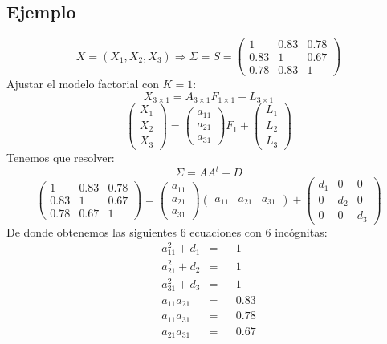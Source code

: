 \documentclass[11pt,a4paper]{article}
\begin{document}
\subsection{Ejemplo}

$$X = (X_{1}, X_{2}, X_{3}) \Rightarrow \Sigma = S = \begin{pmatrix}
1 & 0.83 & 0.78 \\
0.83 & 1 & 0.67 \\
0.78 & 0.83 & 1
\end{pmatrix}$$
Ajustar el modelo factorial con $K=1$:
$$X_{3 \times 1} = A_{3 \times 1}F_{1 \times 1} + L_{3 \times 1}$$
$$\begin{pmatrix} X_{1} \\ X_{2} \\ X_{3} \end{pmatrix} = \begin{pmatrix} a_{11} \\ a_{21} \\ a_{31} \end{pmatrix} F_{1} + \begin{pmatrix} L_{1} \\ L_{2} \\ L_{3} \end{pmatrix}$$
Tenemos que resolver:
$$\Sigma = AA^{t} + D$$
$$\begin{pmatrix}
1 & 0.83 & 0.78 \\
0.83 & 1 & 0.67 \\
0.78 & 0.67 & 1
\end{pmatrix} = \begin{pmatrix} a_{11} \\ a_{21} \\ a_{31} \end{pmatrix} \begin{pmatrix} a_{11} & a_{21} & a_{31} \end{pmatrix} + \begin{pmatrix}
d_{1} & 0 & 0 \\
0 & d_{2} & 0 \\
0 & 0 & d_{3}
\end{pmatrix}$$
De donde obtenemos las siguientes 6 ecuaciones con 6 incógnitas:
$$\begin{aligned}
a_{11}^{2} + d_{1} & = & & 1 \\
a_{21}^{2} + d_{2} & = & & 1 \\
a_{31}^{2} + d_{3} & = & & 1 \\
a_{11}a_{21} & = & & 0.83 \\
a_{11}a_{31} & = & & 0.78 \\
a_{21}a_{31} & = & & 0.67
\end{aligned}$$
\end{document}
